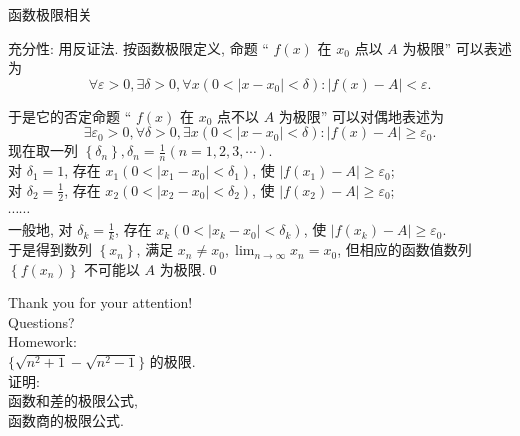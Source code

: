 \documentclass[
10pt,
aspectratio=43,
]{beamer}
\begin{document}
\begin{frame}{函数极限相关}
    \begin{block}{}
        充分性: 用反证法.
        按函数极限定义, 命题 “ $f(x)$ 在 $x_0$ 点以 $A$ 为极限” 可以表述为
        $$
            \forall \varepsilon>0, \exists \delta>0, \forall x\left(0<\left|x-x_0\right|<\delta\right):|f(x)-A|<\varepsilon .
        $$

        于是它的否定命题 “ $f(x)$ 在 $x_0$ 点不以 $A$ 为极限” 可以对偶地表述为
        $$
            \exists \varepsilon_0>0, \forall \delta>0, \exists x\left(0<\left|x-x_0\right|<\delta\right):|f(x)-A| \geqslant \varepsilon_0 .
        $$
        现在取一列 $\left\{\delta_n\right\}, \delta_n=\frac{1}{n}(n=1,2,3, \cdots)$.\\
        对 $\delta_1=1$, 存在 $x_1\left(0<\left|x_1-x_0\right|<\delta_1\right)$, 使 $\left|f\left(x_1\right)-A\right| \geqslant \varepsilon_0$;\\
        对 $\delta_2=\frac{1}{2}$, 存在 $x_2\left(0<\left|x_2-x_0\right|<\delta_2\right)$, 使 $\left|f\left(x_2\right)-A\right| \geqslant \varepsilon_0$;\\
        \vspace{0.1cm}
        $\cdots\cdots$\\
        \vspace{0.1cm}
        一般地, 对 $\delta_k=\frac{1}{k}$, 存在 $x_k\left(0<\left|x_k-x_0\right|<\delta_k\right)$, 使 $\left|f\left(x_k\right)-A\right| \geqslant \varepsilon_0$.\\
        
        \vspace{0.2cm}
        于是得到数列 $\left\{x_n\right\}$, 满足 $x_n \neq x_0, \lim _{n \rightarrow \infty} x_n=x_0$, 但相应的函数值数列 $\left\{f\left(x_n\right)\right\}$ 不可能以 $A$ 为极限.\qed
    \end{block}
\end{frame}

\begin{frame}[plain]
    \vfill
    \centering
    {
    \centering \Huge \color{white} Thank you for your attention!\\[10pt]Questions?\\ [10pt] Homework:\\{$\{\sqrt{n^2+1}-\sqrt{n^2-1}\}$ 的极限.}\\ 证明:\\函数和差的极限公式, \\函数商的极限公式.
    }
    \vfill
\end{frame}
\end{document}
